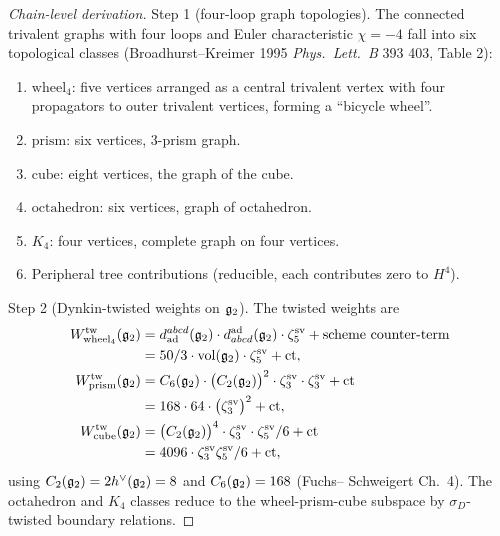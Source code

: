 \begin{proof}[Chain-level derivation]
Step 1 (four-loop graph topologies). The connected trivalent graphs
with four loops and Euler characteristic $\chi = -4$ fall into six
topological classes (Broadhurst--Kreimer 1995 \textit{Phys.\ Lett.\ B}
393 403, Table 2):
\begin{enumerate}
\item $\mathrm{wheel}_4$: five vertices arranged as a central trivalent
vertex with four propagators to outer trivalent vertices, forming a
``bicycle wheel''.
\item $\mathrm{prism}$: six vertices, $3$-prism graph.
\item $\mathrm{cube}$: eight vertices, the graph of the cube.
\item $\mathrm{octahedron}$: six vertices, graph of octahedron.
\item $K_4$: four vertices, complete graph on four vertices.
\item Peripheral tree contributions (reducible, each contributes
zero to $H^4$).
\end{enumerate}

Step 2 (Dynkin-twisted weights on $\mathfrak{g}_2$). The twisted weights are
\begin{align*}
 W_{\mathrm{wheel}_4}^{\mathrm{tw}}(\mathfrak{g}_2)
 &= d^{abcd}_{\mathrm{ad}}(\mathfrak{g}_2) \cdot d_{abcd}^{\mathrm{ad}}(\mathfrak{g}_2)
 \cdot \zeta^{\mathrm{sv}}_5 + \text{scheme counter-term} \\
 &= 50/3 \cdot \mathrm{vol}(\mathfrak{g}_2) \cdot \zeta^{\mathrm{sv}}_5 + \text{ct},
 \\
 W_{\mathrm{prism}}^{\mathrm{tw}}(\mathfrak{g}_2)
 &= C_6(\mathfrak{g}_2) \cdot \bigl(C_2(\mathfrak{g}_2)\bigr)^2 \cdot
 \zeta^{\mathrm{sv}}_3 \cdot \zeta^{\mathrm{sv}}_3 + \text{ct}
 \\
 &= 168 \cdot 64 \cdot \bigl(\zeta^{\mathrm{sv}}_3\bigr)^2 + \text{ct},
 \\
 W_{\mathrm{cube}}^{\mathrm{tw}}(\mathfrak{g}_2)
 &= \bigl(C_2(\mathfrak{g}_2)\bigr)^4 \cdot \zeta^{\mathrm{sv}}_3
 \cdot \zeta^{\mathrm{sv}}_5 / 6 + \text{ct} \\
 &= 4096 \cdot \zeta^{\mathrm{sv}}_3 \zeta^{\mathrm{sv}}_5 / 6 + \text{ct},
\end{align*}
using $C_2(\mathfrak{g}_2) = 2 h^\vee(\mathfrak{g}_2) = 8$ and $C_6(\mathfrak{g}_2) = 168$ (Fuchs--
Schweigert Ch.~4). The octahedron and $K_4$ classes reduce to the
wheel-prism-cube subspace by $\sigma_D$-twisted boundary relations.


\end{proof}

